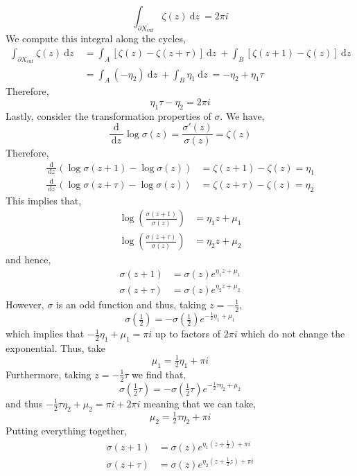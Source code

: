 \documentclass[12pt]{extarticle}
\renewcommand{\d}[1]{\: \mathrm{d}#1 \:}
\newcommand{\deriv}[2]{\frac{\d{#1}}{\d{#2}}}
\theoremstyle{definition}
\newcommand{\Xcut}{X_{\text{cut}}}
\begin{document}
\[ \int_{\partial \Xcut} \zeta(z) \d{z} = 2 \pi i \]
We compute this integral along the cycles,
\begin{align*}
\int_{\partial \Xcut} \zeta(z) \d{z} & = \int_A \left[ \zeta(z) - \zeta(z + \tau) \right] \d{z} + \int_B \left[ \zeta(z + 1) - \zeta(z) \right] \d{z}
\\
& = \int_A (- \eta_2) \d{z} + \int_B \eta_1 \d{z} = - \eta_2 + \eta_1 \tau 
\end{align*}
Therefore, 
\[ \eta_1 \tau - \eta_2 = 2 \pi i \]
Lastly, consider the transformation properties of $\sigma$. We have,
\[ \deriv{}{z} \log{\sigma(z)} = \frac{\sigma'(z)}{\sigma(z)} = \zeta(z) \]
Therefore,
\begin{align*}
\deriv{}{z} \left( \log{\sigma(z + 1)} - \log{\sigma(z)} \right) & = \zeta(z + 1) - \zeta(z) = \eta_1
\\
\deriv{}{z} \left( \log{\sigma(z + \tau)} - \log{\sigma(z)} \right) & = \zeta(z + \tau) - \zeta(z) = \eta_2
\end{align*}
This implies that,
\begin{align*}
\log{\left( \frac{\sigma(z + 1)}{\sigma(z)} \right)} & = \eta_1 z + \mu_1 
\\
\log{\left( \frac{\sigma(z + \tau)}{\sigma(z)} \right)} & = \eta_2 z + \mu_2
\end{align*}
and hence,
\begin{align*}
\sigma(z + 1) & = \sigma(z) e^{\eta_1 z + \mu_1}
\\
\sigma(z + \tau) & = \sigma(z) e^{\eta_2 z + \mu_2}
\end{align*}
However, $\sigma$ is an odd function and thus, taking $z = -\frac{1}{2}$,
\[ \sigma(\tfrac{1}{2}) = - \sigma(\tfrac{1}{2}) e^{-\frac{1}{2} \eta_1 + \mu_1} \]
which implies that $-\frac{1}{2} \eta_1 + \mu_1 = \pi i$ up to factors of $2 \pi i$ which do not change the exponential. Thus, take 
\[ \mu_1 = \tfrac{1}{2} \eta_1 + \pi i \]
Furthermore, taking $z = - \frac{1}{2} \tau$ we find that,
\[ \sigma(\tfrac{1}{2} \tau) = - \sigma(\tfrac{1}{2} \tau) e^{-\frac{1}{2} \tau \eta_2 + \mu_2} \]
and thus $- \frac{1}{2} \tau \eta_2 + \mu_2 = \pi i + 2\pi i$ meaning that we can take,
\[ \mu_2 = \tfrac{1}{2} \tau \eta_2 + \pi i \]
Putting everything together,
\begin{align*}
\sigma(z + 1) & = \sigma(z) e^{\eta_1 (z + \tfrac{1}{2}) + \pi i}
\\
\sigma(z + \tau) & = \sigma(z) e^{\eta_2 (z + \tfrac{1}{2} z) + \pi i}
\end{align*}  
\end{document}
